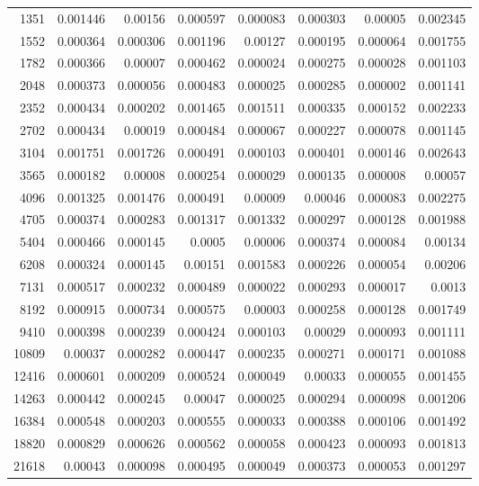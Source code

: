 \begin{tabular}{r r r r r r r r}
1351 & 0.001446 & 0.00156 & 0.000597 & 0.000083 & 0.000303 & 0.00005 & 0.002345 \\
1552 & 0.000364 & 0.000306 & 0.001196 & 0.00127 & 0.000195 & 0.000064 & 0.001755 \\
1782 & 0.000366 & 0.00007 & 0.000462 & 0.000024 & 0.000275 & 0.000028 & 0.001103 \\
2048 & 0.000373 & 0.000056 & 0.000483 & 0.000025 & 0.000285 & 0.000002 & 0.001141 \\
2352 & 0.000434 & 0.000202 & 0.001465 & 0.001511 & 0.000335 & 0.000152 & 0.002233 \\
2702 & 0.000434 & 0.00019 & 0.000484 & 0.000067 & 0.000227 & 0.000078 & 0.001145 \\
3104 & 0.001751 & 0.001726 & 0.000491 & 0.000103 & 0.000401 & 0.000146 & 0.002643 \\
3565 & 0.000182 & 0.00008 & 0.000254 & 0.000029 & 0.000135 & 0.000008 & 0.00057 \\
4096 & 0.001325 & 0.001476 & 0.000491 & 0.00009 & 0.00046 & 0.000083 & 0.002275 \\
4705 & 0.000374 & 0.000283 & 0.001317 & 0.001332 & 0.000297 & 0.000128 & 0.001988 \\
5404 & 0.000466 & 0.000145 & 0.0005 & 0.00006 & 0.000374 & 0.000084 & 0.00134 \\
6208 & 0.000324 & 0.000145 & 0.00151 & 0.001583 & 0.000226 & 0.000054 & 0.00206 \\
7131 & 0.000517 & 0.000232 & 0.000489 & 0.000022 & 0.000293 & 0.000017 & 0.0013 \\
8192 & 0.000915 & 0.000734 & 0.000575 & 0.00003 & 0.000258 & 0.000128 & 0.001749 \\
9410 & 0.000398 & 0.000239 & 0.000424 & 0.000103 & 0.00029 & 0.000093 & 0.001111 \\
10809 & 0.00037 & 0.000282 & 0.000447 & 0.000235 & 0.000271 & 0.000171 & 0.001088 \\
12416 & 0.000601 & 0.000209 & 0.000524 & 0.000049 & 0.00033 & 0.000055 & 0.001455 \\
14263 & 0.000442 & 0.000245 & 0.00047 & 0.000025 & 0.000294 & 0.000098 & 0.001206 \\
16384 & 0.000548 & 0.000203 & 0.000555 & 0.000033 & 0.000388 & 0.000106 & 0.001492 \\
18820 & 0.000829 & 0.000626 & 0.000562 & 0.000058 & 0.000423 & 0.000093 & 0.001813 \\
21618 & 0.00043 & 0.000098 & 0.000495 & 0.000049 & 0.000373 & 0.000053 & 0.001297 \\

\end{tabular}
